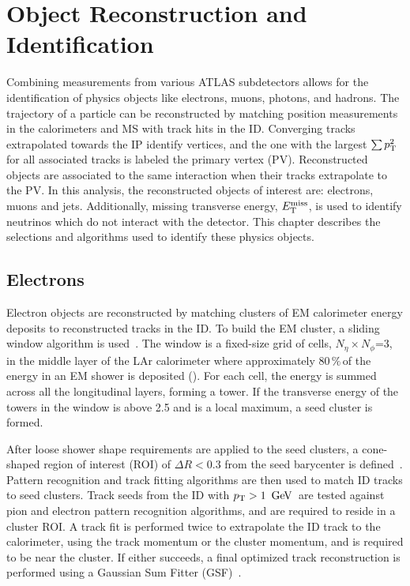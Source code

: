 \chapter{Object Reconstruction and Identification}
\label{ch:objreco}

Combining measurements from various ATLAS subdetectors allows for the identification of physics objects like electrons, muons, photons, and hadrons. The trajectory of a particle can be reconstructed by matching position measurements in the calorimeters and MS with track hits in the ID. Converging tracks extrapolated towards the IP identify vertices, and the one with the largest $\sum p_{\text{T}}^2$ for all associated tracks is labeled the primary vertex (PV).  Reconstructed objects are associated to the same interaction when their tracks extrapolate to the PV. In this analysis, the reconstructed objects of interest are: electrons, muons and jets. Additionally, missing transverse energy, $E_{\text{T}}^{\text{miss}}$, is used to identify neutrinos which do not interact with the detector. This chapter describes the selections and algorithms used to identify these physics objects.

%
\section{Electrons}
\label{ch:objreco:el}
Electron objects are reconstructed by matching clusters of EM calorimeter energy deposits to reconstructed tracks in the ID. To build the EM cluster, a sliding window algorithm is used~\cite{sliding_window}. The window is a fixed-size grid of cells, $N_{\eta}\times N_{\phi}$=3, in the middle layer of the LAr calorimeter where approximately $80\,\%$\,of the energy in an EM shower is deposited (\Sect{\ref{ch:atlas:particle_showers}}). For each cell, the energy is summed across all the longitudinal layers, forming a tower. If the transverse energy of the towers in the window is above 2.5\,\GeV\,and is a local maximum, a seed cluster is formed. 

After loose shower shape requirements are applied to the seed clusters, a cone-shaped region of interest (ROI) of $\Delta R<0.3$ from the seed barycenter is defined~\cite{electron_efficiency, electron_efficiency_2016}.  Pattern recognition and track fitting algorithms are then used to match ID tracks to seed clusters. Track seeds from the ID with $\pT>1\,\GeV$\, are tested against pion and electron pattern recognition algorithms, and are required to reside in a cluster ROI. A track fit is performed twice to extrapolate the ID track to the calorimeter, using the track momentum or the cluster momentum, and is required to be near the cluster. If either succeeds, a final optimized track reconstruction is performed using a Gaussian Sum Fitter (GSF)~\cite{gsm_filter}. 

